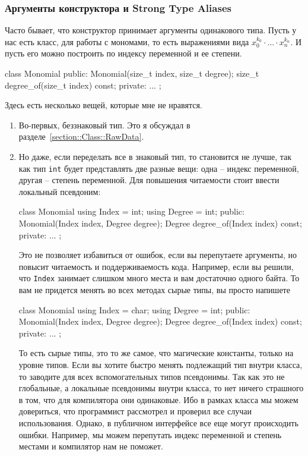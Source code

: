 \subsubsection{Аргументы конструктора и Strong Type Aliases}
\label{section::CtorArgs}

Часто бывает, что конструктор принимает аргументы одинакового типа.
Пусть у нас есть класс, для работы с мономами, то есть выражениями вида $x_0^{k_0}\cdot \ldots \cdot x_n^{k_n}$.
И пусть его можно построить по индексу переменной и ее степени.
\begin{cppcode}
class Monomial {
public:
  Monomial(size_t index, size_t degree);
  size_t degree_of(size_t index) const;
private:
  ...
};
\end{cppcode}
Здесь есть несколько вещей, которые мне не нравятся.
\begin{enumerate}
\item Во-первых, беззнаковый тип.
Это я обсуждал в разделе~\ref{section::Class::RawData}.

\item Но даже, если переделать все в знаковый тип, то становится не лучше, так как тип \verb"int" будет представлять две разные вещи: одна -- индекс переменной, другая -- степень переменной.
Для повышения читаемости стоит ввести локальный псевдоним:
\begin{cppcode}
class Monomial {
  using Index = int;
  using Degree = int;
public:
  Monomial(Index index, Degree degree);
  Degree degree_of(Index index) const;
private:
  ...
};
\end{cppcode}
Это не позволяет избавиться от ошибок, если вы перепутаете аргументы, но повысит читаемость и поддерживаемость кода.
Например, если вы решили, что \verb"Index" занимает слишком много места и вам достаточно одного байта.
То вам не придется менять во всех методах сырые типы, вы просто напишете
\begin{cppcode}
class Monomial {
  using Index = char;
  using Degree = int;
public:
  Monomial(Index index, Degree degree);
  Degree degree_of(Index index) const;
private:
  ...
};
\end{cppcode}
То есть сырые типы, это то же самое, что магические константы, только на уровне типов.
Если вы хотите быстро менять подлежащий тип внутри класса, то заводите для всех вспомогательных типов псевдонимы.
Так как это не глобальные, а локальные псевдонимы внутри класса, то нет ничего страшного в том, что для компилятора они одинаковые.
Ибо в рамках класса мы можем довериться, что программист рассмотрел и проверил все случаи использования.
Однако, в публичном интерфейсе все еще могут происходить ошибки.
Например, мы можем перепутать индекс переменной и степень местами и компилятор нам не поможет.


\end{enumerate}
